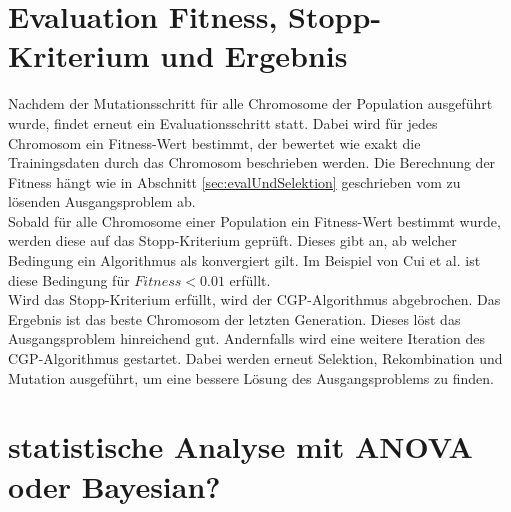 \section{Evaluation Fitness, Stopp-Kriterium und Ergebnis}
\label{sec:fitness,StopKrit,Ergebnis}

Nachdem der Mutationsschritt für alle Chromosome der Population ausgeführt wurde, findet erneut ein Evaluationsschritt statt.
Dabei wird für jedes Chromosom ein Fitness-Wert bestimmt, der bewertet wie exakt die Trainingsdaten durch das Chromosom beschrieben werden. \cite{milad_taleby_ahvanooey_survey_2019}
Die Berechnung der Fitness hängt wie in Abschnitt \ref{sec:evalUndSelektion} geschrieben vom zu lösenden Ausgangsproblem ab.\\
Sobald für alle Chromosome einer Population ein Fitness-Wert bestimmt wurde, werden diese auf das Stopp-Kriterium geprüft.
Dieses gibt an, ab welcher Bedingung ein Algorithmus als konvergiert gilt.
Im Beispiel von Cui et al. ist diese Bedingung für $Fitness < 0.01$ erfüllt. \cite{affenzeller_positional_2024}\\
Wird das Stopp-Kriterium erfüllt, wird der CGP-Algorithmus abgebrochen.
Das Ergebnis ist das beste Chromosom der letzten Generation.
Dieses löst das Ausgangsproblem hinreichend gut.
Andernfalls wird eine weitere Iteration des CGP-Algorithmus gestartet. 
Dabei werden erneut Selektion, Rekombination und Mutation ausgeführt, um eine bessere Lösung des Ausgangsproblems zu finden.

\section{statistische Analyse mit ANOVA oder Bayesian?}
\label{sec:anova}
